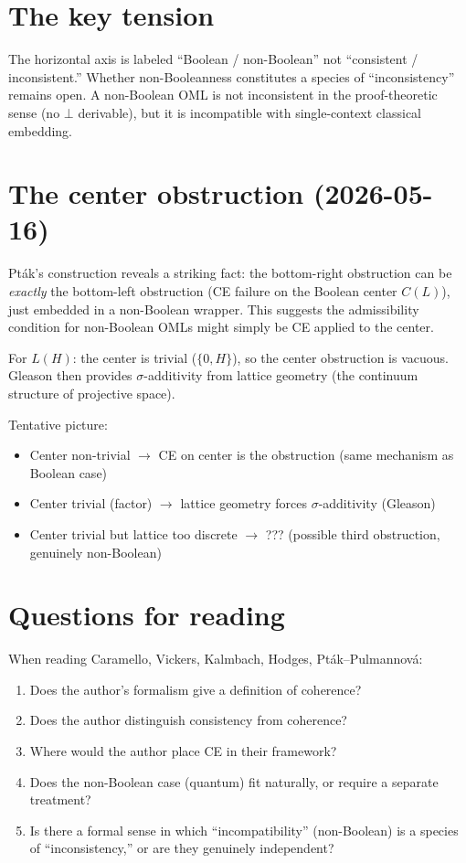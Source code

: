 \documentclass[11pt]{article}
\begin{document}
\section*{The key tension}

The horizontal axis is labeled ``Boolean / non-Boolean'' not
``consistent / inconsistent.''  Whether non-Booleanness constitutes
a species of ``inconsistency'' remains open.  A non-Boolean OML is
not inconsistent in the proof-theoretic sense (no $\bot$ derivable),
but it is incompatible with single-context classical embedding.

\section*{The center obstruction (2026-05-16)}

Pt\'{a}k's construction reveals a striking fact: the bottom-right
obstruction can be \emph{exactly} the bottom-left obstruction (CE
failure on the Boolean center $C(L)$), just embedded in a non-Boolean
wrapper.  This suggests the admissibility condition for non-Boolean OMLs
might simply be CE applied to the center.

For $L(H)$: the center is trivial ($\{0, H\}$), so the center
obstruction is vacuous.  Gleason then provides $\sigma$-additivity
from lattice geometry (the continuum structure of projective space).

Tentative picture:
\begin{itemize}[nosep]
  \item Center non-trivial $\to$ CE on center is the obstruction
    (same mechanism as Boolean case)
  \item Center trivial (factor) $\to$ lattice geometry forces
    $\sigma$-additivity (Gleason)
  \item Center trivial but lattice too discrete $\to$ ??? (possible
    third obstruction, genuinely non-Boolean)
\end{itemize}

\section*{Questions for reading}

When reading Caramello, Vickers, Kalmbach, Hodges, Pt\'{a}k--Pulmannov\'{a}:
\begin{enumerate}[nosep]
  \item Does the author's formalism give a definition of coherence?
  \item Does the author distinguish consistency from coherence?
  \item Where would the author place CE in their framework?
  \item Does the non-Boolean case (quantum) fit naturally, or require
    a separate treatment?
  \item Is there a formal sense in which ``incompatibility'' (non-Boolean)
    is a species of ``inconsistency,'' or are they genuinely independent?
\end{enumerate}
\end{document}
